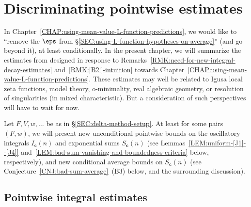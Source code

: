 \documentclass[12pt]{report}
\begin{document}

\chapter{Discriminating pointwise estimates}
\label{CHAP:discriminating-pointwise-estimates}

In Chapter~\ref{CHAP:using-mean-value-L-function-predictions}, we would like to ``remove the $\eps$ from \S\ref{SEC:using-L-function-hypotheses-on-average}'' (and go beyond it), at least conditionally.
In the present chapter, we will summarize the estimates from \cite{wang2021_HLH_vs_RMT} designed in response to Remarks~\ref{RMK:need-for-new-integral-decay-estimates} and~\ref{RMK:[B2']-intuition} towards Chapter~\ref{CHAP:using-mean-value-L-function-predictions}.
These estimates may well be related to
Igusa local zeta functions, model theory, o-minimality, real algebraic geometry, or resolution of singularities (in mixed characteristic).
But a consideration of such perspectives will have to wait for now.

Let $F,V,w,\dots$ be as in \S\ref{SEC:delta-method-setup}.
At least for some pairs $(F,w)$,
we will present new unconditional pointwise bounds on the oscillatory integrals $I_{\bm{c}}(n)$ and exponential sums $S_{\bm{c}}(n)$ (see Lemmas~\ref{LEM:uniform-[J1]--[J4]} and~\ref{LEM:bad-sum-vanishing-and-boundedness-criteria} below, respectively),
and new conditional average bounds on $S_{\bm{c}}(n)$ (see Conjecture~\ref{CNJ:bad-sum-average}~(B3) below, and the surrounding discussion).

\section{Pointwise integral estimates}
\end{document}
